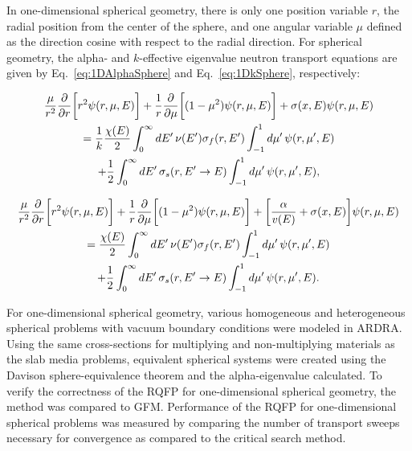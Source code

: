 In one-dimensional spherical geometry, there is only one position variable $r$, the radial position from the center of the sphere, and one angular variable $\mu$ defined as the direction cosine with respect to the radial direction. For spherical geometry, the alpha- and $k$-effective eigenvalue neutron transport equations are given by Eq.~\ref{eq:1DAlphaSphere} and Eq.~\ref{eq:1DkSphere}, respectively:

\begin{multline}
\frac{\mu}{r^{2}} \frac{\partial}{\partial r} \bigg [r^{2} \psi(r,\mu,E) \bigg ] + \frac{1}{r} \frac{\partial}{\partial \mu} \bigg [(1-\mu^{2})\psi(r,\mu,E) \bigg ]+ \sigma(x,E) \psi(r,\mu,E) \\ = \frac{1}{k} \frac{\chi(E)}{2} \int_{0}^{\infty} \mathop{}\!d E' \, \nu(E') \sigma_{f}(r,E') \int_{-1}^{1} \mathop{}\!d \mu' \, \psi(r,\mu',E) \\ + \frac{1}{2} \int_{0}^{\infty} \mathop{}\!d E' \, \sigma_{s}(r, E' \rightarrow E) \int_{-1}^{1} \mathop{}\!d \mu' \, \psi(r,\mu',E),
\label{eq:1DAlphaSphere}
\end{multline}

\begin{multline}
\frac{\mu}{r^{2}} \frac{\partial}{\partial r} \bigg [r^{2} \psi(r,\mu,E) \bigg ] + \frac{1}{r} \frac{\partial}{\partial \mu} \bigg [(1-\mu^{2})\psi(r,\mu,E) \bigg ]+ \bigg [ \frac{\alpha}{v(E)} + \sigma(x,E) \bigg ] \psi(r,\mu,E) \\ = \frac{\chi(E)}{2} \int_{0}^{\infty} \mathop{}\!d E' \, \nu(E') \sigma_{f}(r,E') \int_{-1}^{1} \mathop{}\!d \mu' \, \psi(r,\mu',E) \\ + \frac{1}{2} \int_{0}^{\infty} \mathop{}\!d E' \, \sigma_{s}(r, E' \rightarrow E) \int_{-1}^{1} \mathop{}\!d \mu' \, \psi(r,\mu',E).
\label{eq:1DkSphere}
\end{multline}

For one-dimensional spherical geometry, various homogeneous and heterogeneous spherical problems with vacuum boundary conditions were modeled in ARDRA. Using the same cross-sections for multiplying and non-multiplying materials as the slab media problems, equivalent spherical systems were created using the Davison sphere-equivalence theorem \cite{davison1957neutron} and the alpha-eigenvalue calculated. To verify the correctness of the RQFP for one-dimensional spherical geometry, the method was compared to GFM. Performance of the RQFP for one-dimensional spherical problems was measured by comparing the number of transport sweeps necessary for convergence as compared to the critical search method.

